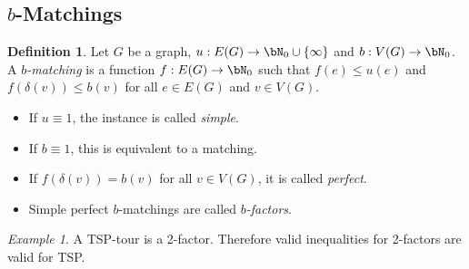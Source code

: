 \documentclass[11pt, a4paper]{article}
\newcommand{\set}[1]{\{#1\}}
\theoremstyle{remark}
\newtheorem*{example}{Example}
\theoremstyle{definition}
\newtheorem{definition}[theorem]{Definition}
\begin{document}
\subsection{\texorpdfstring{$b$}{b}-Matchings}
\begin{definition}
	Let $G$ be a graph, $u: E(G)\to \bN_0\cup\set{\infty}$ and
	$b: V(G)\to\bN_0$. A \emph{$b$-matching} is a function $f: E(G)\to\bN_0$
	such that $f(e)\leq u(e)$ and $f(\delta(v))\leq b(v)$ for all $e\in E(G)$
	and $v\in V(G)$.
	\begin{itemize}
		\item If $u\equiv 1$, the instance is called \emph{simple}.
		\item If $b\equiv 1$, this is equivalent to a matching.
		\item If $f(\delta(v))=b(v)$ for all $v\in V(G)$, it is called
		\emph{perfect}.
		\item Simple perfect $b$-matchings are called \emph{$b$-factors}.
	\end{itemize}
\end{definition}

\begin{example}
	A TSP-tour is a 2-factor. Therefore valid inequalities for 2-factors are
	valid for TSP.
\end{example}
\end{document}
